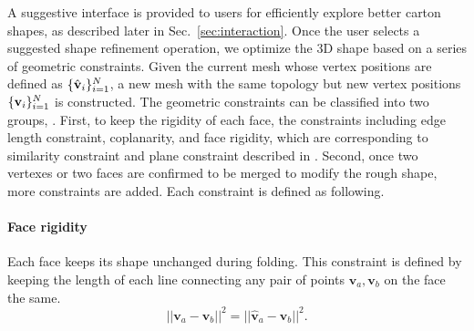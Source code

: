 
A suggestive interface is provided to users for efficiently explore better carton shapes, as described later in Sec.~\ref{sec:interaction}. 
%
Once the user selects a suggested shape refinement operation, we optimize the 3D shape based on a series of geometric constraints.
Given the current mesh whose vertex positions are defined as $\{\hat{\mathbf{v}}_i\}^{N}_{i=1}$, a new mesh with the same topology but new vertex positions $\{\mathbf{v}_i\}^{N}_{i=1}$ is constructed.
%
The geometric constraints can be classified into two groups, .
% 
First, to keep the rigidity of each face, the constraints including edge length constraint, coplanarity, and face rigidity, which are corresponding to similarity constraint and plane constraint described in \cite{Bouaziz:2012:SSD:2346796.2346802}. 
%
Second, once two vertexes or two faces are confirmed to be merged to modify the rough shape, more constraints are added. 
%
Each constraint is defined as following.  



\paragraph{Face rigidity} 
Each face keeps its shape unchanged during folding. This constraint is defined by keeping the length of each line connecting any pair of points $\mathbf{v}_{a}, \mathbf{v}_{b}$ on the face the same.
\begin{equation}
||\mathbf{v}_{a} - \mathbf{v}_{b}||^2 = ||\hat{\mathbf{v}}_{a} - \hat{\mathbf{v}}_{b}||^2.
\label{equ:plane}
\end{equation}




